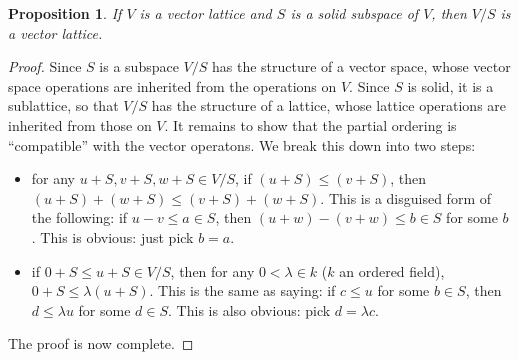 \documentclass[12pt]{article}
\newtheorem{prop}{Proposition}
\begin{document}
\begin{prop}  If $V$ is a vector lattice and $S$ is a solid subspace of $V$, then $V/S$ is a vector lattice.
\end{prop}
\begin{proof}
Since $S$ is a subspace $V/S$ has the structure of a vector space, whose vector space operations are inherited from the operations on $V$.  Since $S$ is solid, it is a sublattice, so that $V/S$ has the structure of a lattice, whose lattice operations are inherited from those on $V$.  It remains to show that the partial ordering is ``compatible'' with the vector operatons.  We break this down into two steps:
\begin{itemize}
\item for any $u+S,v+S,w+S \in V/S$, if $(u+S)\le (v+S)$, then $(u+S)+(w+S)\le (v+S)+(w+S)$.  This is a disguised form of the following: if $u-v\le a\in S$, then $(u+w)-(v+w)\le b\in S$ for some $b$.  This is obvious: just pick $b=a$.
\item if $0+S\le u+S\in V/S$, then for any $0<\lambda \in k$ ($k$ an ordered field), $0+S\le \lambda (u+S)$.  This is the same as saying: if $c\le u$ for some $b\in S$, then $d\le \lambda u$ for some $d\in S$.  This is also obvious: pick $d=\lambda c$.
\end{itemize}
The proof is now complete.
\end{proof}
\end{document}
